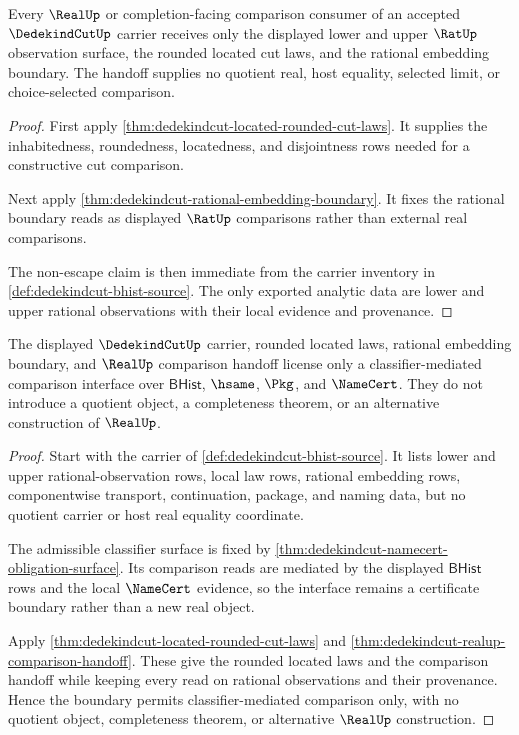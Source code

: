 \begin{theorem}
\label{thm:dedekindcut-realup-comparison-handoff}
Every $\RealUp$ or completion-facing comparison consumer of an accepted $\DedekindCutUp$ carrier receives only the displayed lower and upper $\RatUp$ observation surface, the rounded located cut laws, and the rational embedding boundary. The handoff supplies no quotient real, host equality, selected limit, or choice-selected comparison.
\end{theorem}
\begin{proof}
First apply \autoref{thm:dedekindcut-located-rounded-cut-laws}. It supplies the inhabitedness, roundedness, locatedness, and disjointness rows needed for a constructive cut comparison.

Next apply \autoref{thm:dedekindcut-rational-embedding-boundary}. It fixes the rational boundary reads as displayed $\RatUp$ comparisons rather than external real comparisons.

The non-escape claim is then immediate from the carrier inventory in \autoref{def:dedekindcut-bhist-source}. The only exported analytic data are lower and upper rational observations with their local evidence and provenance.
\end{proof}

\begin{theorem}
\label{thm:dedekindcut-quotient-free-boundary}
The displayed $\DedekindCutUp$ carrier, rounded located laws, rational embedding boundary, and $\RealUp$ comparison handoff license only a classifier-mediated comparison interface over $\mathsf{BHist}$, $\hsame$, $\Pkg$, and $\NameCert$. They do not introduce a quotient object, a completeness theorem, or an alternative construction of $\RealUp$.
\end{theorem}
\begin{proof}
Start with the carrier of \autoref{def:dedekindcut-bhist-source}. It lists lower and upper rational-observation rows, local law rows, rational embedding rows, componentwise transport, continuation, package, and naming data, but no quotient carrier or host real equality coordinate.

The admissible classifier surface is fixed by \autoref{thm:dedekindcut-namecert-obligation-surface}. Its comparison reads are mediated by the displayed $\mathsf{BHist}$ rows and the local $\NameCert$ evidence, so the interface remains a certificate boundary rather than a new real object.

Apply \autoref{thm:dedekindcut-located-rounded-cut-laws} and \autoref{thm:dedekindcut-realup-comparison-handoff}. These give the rounded located laws and the comparison handoff while keeping every read on rational observations and their provenance. Hence the boundary permits classifier-mediated comparison only, with no quotient object, completeness theorem, or alternative $\RealUp$ construction.
\end{proof}

